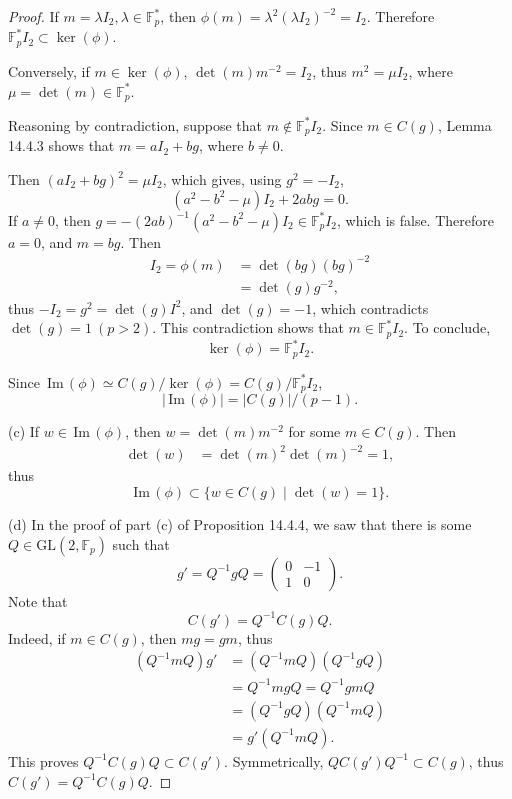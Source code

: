 \documentclass[11pt,a4paper]{article}
\newcommand{\F}{\mathbb{F}}
\newcommand{\im}{\,\mathrm{Im}\,}
\begin{document}
{\begin{proof}
If $m = \lambda I_2, \lambda \in \F_p^*$, then $\phi(m) = \lambda^2 (\lambda I_2)^{-2} = I_2$. Therefore $\F_p^* I_2 \subset \ker(\phi)$.

Conversely, if $m\in \ker(\phi)$, $\det(m) m^{-2} = I_2$, thus $m^2 = \mu I_2$, where $\mu = \det(m) \in \F_p^*$.

Reasoning by contradiction, suppose that $m \not \in \F_p^* I_2$. Since $m\in C(g)$, Lemma 14.4.3 shows that $m = aI_2 + bg$, where $b\ne 0$.

Then $(aI_2 + bg)^2 = \mu I_2$, which gives, using $g^2 = -I_2$,
$$(a^2 - b^2 - \mu) I_2 + 2ab g = 0.$$
If $a \ne 0$, then $g = -(2ab)^{-1} (a^2 -b^2 - \mu) I_2 \in \F_p^* I_2$, which is false. Therefore $a= 0$, and $m= bg$. Then 
\begin{align*}
I_2 = \phi(m) &= \det(bg) (bg)^{-2}\\
&= \det(g) g^{-2},
\end{align*}
thus $-I_2 = g^2 = \det(g) I^2$, and $\det(g) = -1$, which contradicts $\det(g) = 1\ (p>2)$. This contradiction shows that $m \in \F_p^* I_2$. To conclude,
$$\ker(\phi) = \F_p^* I_2.$$

Since $\im(\phi) \simeq C(g)/\ker(\phi) = C(g)/\F_p^* I_2$,
$$|\im(\phi)| = |C(g)|/(p-1).$$

\item[(c)] If $w \in \im(\phi)$, then $w = \det(m) m^{-2}$ for some $m \in C(g)$. Then
\begin{align*}
\det(w) &= \det(m)^2 \det(m)^{-2} = 1,
\end{align*}
thus
$$\im(\phi) \subset \{w \in C(g) \mid \det(w) = 1\}.$$

\item[(d)] In the proof of part (c) of Proposition 14.4.4, we saw that there is some $Q \in \mathrm{GL}(2,\F_p)$ such that
$$g' = Q^{-1} g Q = \begin{pmatrix}0 & -1\\1 & 0 \end{pmatrix}.$$
Note that $$C(g') = Q^{-1} C(g) Q.$$
Indeed, if $m \in C(g)$, then $mg = gm$, thus
\begin{align*}
(Q^{-1} m Q) g' &= (Q^{-1} m Q )(Q^{-1} g Q)\\
&= Q^{-1} mg Q = Q^{-1} g m Q\\
&= (Q^{-1} g Q)(Q^{-1} m Q)\\
&= g' (Q^{-1} m Q).
\end{align*}
This proves $Q^{-1} C(g) Q \subset C(g')$. Symmetrically,  $QC(g')Q^{-1} \subset  C(g)$, thus $C(g') = Q^{-1} C(g) Q.$


\end{proof}}
\end{document}
